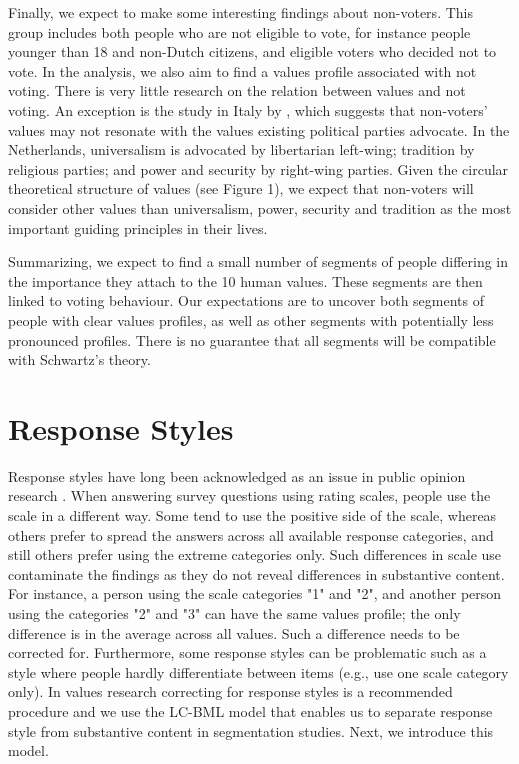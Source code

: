 \documentclass[12pt,letter]{article}\usepackage[]{graphicx}\usepackage[]{xcolor}
\begin{document}
Finally, we expect to make some interesting findings about non-voters. This group includes both people who are not eligible to vote, for instance people younger than 18 and non-Dutch citizens, and eligible voters who decided not to vote. In the analysis, we also aim to find a values profile associated with not voting. There is very little research on the relation between values and not voting. An exception is the study in Italy by \citet{caprara2012}, which suggests that non-voters' values may not resonate with the values existing political parties advocate. In the Netherlands, universalism is advocated by libertarian left-wing; tradition by religious parties; and power and security by right-wing parties. Given the circular theoretical structure of values (see Figure 1), we expect that non-voters will consider other values than universalism, power, security and tradition as the most important guiding principles in their lives. 

Summarizing, we expect to find a small number of segments of people differing in the importance they attach to the 10 human values. These segments are then linked to voting behaviour. Our expectations are to uncover both segments of people with clear values profiles, as well as other segments with potentially less pronounced profiles. There is no guarantee that all segments will be compatible with Schwartz's theory.

\section*{Response Styles}

Response styles have long been acknowledged as an issue in public opinion research \citep[for example,][] {peter2011,greenleaf1992,alwin1985,bachman1984,cunningham1977,oneill1967}. When answering survey questions using rating scales, people use the scale in a different way. Some tend to use the positive side of the scale, whereas others prefer to spread the answers across all available response categories, and still others prefer using the extreme categories only. Such differences in scale use contaminate the findings as they do not reveal differences in substantive content. For instance, a person using the scale categories "1" and "2", and another person using the categories "2" and "3" can have the same values profile; the only difference is in the average across all values. Such a difference needs to be corrected for. Furthermore, some response styles can be problematic such as a style where people hardly differentiate between items (e.g., use one scale category only). In values research correcting for response styles is a recommended procedure \citep{schwartz2007} and we use the LC-BML model \citep{vanrosmalen2010} that enables us to separate response style from substantive content in segmentation studies. Next, we introduce this model.
\end{document}
